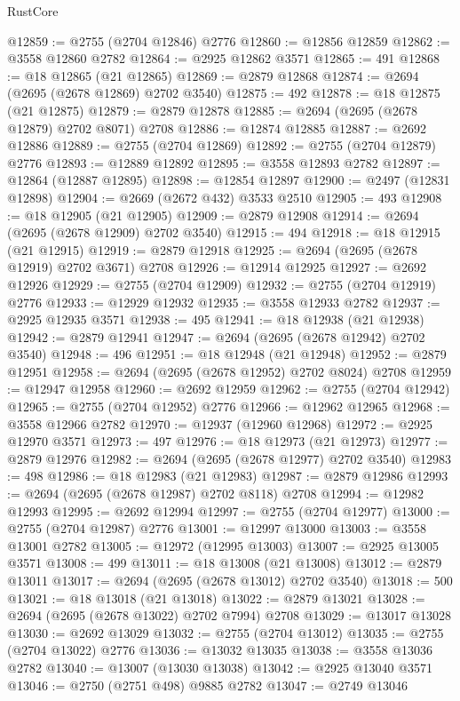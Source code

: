 \begin{lexlean}{RustCore}
\begin{coremodule}
@12859 := @2755 (@2704 @12846) @2776
@12860 := @12856 @12859
@12862 := @3558 @12860 @2782
@12864 := @2925 @12862 @3571
@12865 := 491
@12868 := @18 @12865 (@21 @12865)
@12869 := @2879 @12868
@12874 := @2694 (@2695 (@2678 @12869) @2702 @3540)
@12875 := 492
@12878 := @18 @12875 (@21 @12875)
@12879 := @2879 @12878
@12885 := @2694 (@2695 (@2678 @12879) @2702 @8071) @2708
@12886 := @12874 @12885
@12887 := @2692 @12886
@12889 := @2755 (@2704 @12869)
@12892 := @2755 (@2704 @12879) @2776
@12893 := @12889 @12892
@12895 := @3558 @12893 @2782
@12897 := @12864 (@12887 @12895)
@12898 := @12854 @12897
@12900 := @2497 (@12831 @12898)
@12904 := @2669 (@2672 @432) @3533 @2510
@12905 := 493
@12908 := @18 @12905 (@21 @12905)
@12909 := @2879 @12908
@12914 := @2694 (@2695 (@2678 @12909) @2702 @3540)
@12915 := 494
@12918 := @18 @12915 (@21 @12915)
@12919 := @2879 @12918
@12925 := @2694 (@2695 (@2678 @12919) @2702 @3671) @2708
@12926 := @12914 @12925
@12927 := @2692 @12926
@12929 := @2755 (@2704 @12909)
@12932 := @2755 (@2704 @12919) @2776
@12933 := @12929 @12932
@12935 := @3558 @12933 @2782
@12937 := @2925 @12935 @3571
@12938 := 495
@12941 := @18 @12938 (@21 @12938)
@12942 := @2879 @12941
@12947 := @2694 (@2695 (@2678 @12942) @2702 @3540)
@12948 := 496
@12951 := @18 @12948 (@21 @12948)
@12952 := @2879 @12951
@12958 := @2694 (@2695 (@2678 @12952) @2702 @8024) @2708
@12959 := @12947 @12958
@12960 := @2692 @12959
@12962 := @2755 (@2704 @12942)
@12965 := @2755 (@2704 @12952) @2776
@12966 := @12962 @12965
@12968 := @3558 @12966 @2782
@12970 := @12937 (@12960 @12968)
@12972 := @2925 @12970 @3571
@12973 := 497
@12976 := @18 @12973 (@21 @12973)
@12977 := @2879 @12976
@12982 := @2694 (@2695 (@2678 @12977) @2702 @3540)
@12983 := 498
@12986 := @18 @12983 (@21 @12983)
@12987 := @2879 @12986
@12993 := @2694 (@2695 (@2678 @12987) @2702 @8118) @2708
@12994 := @12982 @12993
@12995 := @2692 @12994
@12997 := @2755 (@2704 @12977)
@13000 := @2755 (@2704 @12987) @2776
@13001 := @12997 @13000
@13003 := @3558 @13001 @2782
@13005 := @12972 (@12995 @13003)
@13007 := @2925 @13005 @3571
@13008 := 499
@13011 := @18 @13008 (@21 @13008)
@13012 := @2879 @13011
@13017 := @2694 (@2695 (@2678 @13012) @2702 @3540)
@13018 := 500
@13021 := @18 @13018 (@21 @13018)
@13022 := @2879 @13021
@13028 := @2694 (@2695 (@2678 @13022) @2702 @7994) @2708
@13029 := @13017 @13028
@13030 := @2692 @13029
@13032 := @2755 (@2704 @13012)
@13035 := @2755 (@2704 @13022) @2776
@13036 := @13032 @13035
@13038 := @3558 @13036 @2782
@13040 := @13007 (@13030 @13038)
@13042 := @2925 @13040 @3571
@13046 := @2750 (@2751 @498) @9885 @2782
@13047 := @2749 @13046

\end{coremodule}
\end{lexlean}
